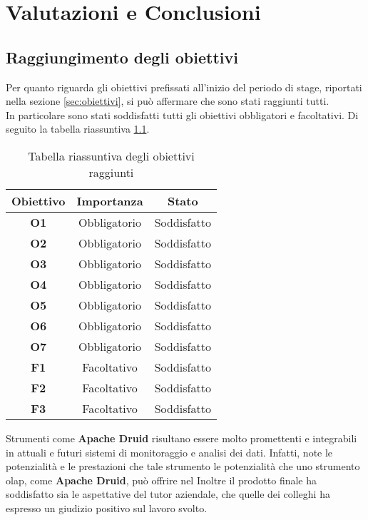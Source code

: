 \chapter{Valutazioni e Conclusioni}
\label{cap:conclusioni}
\section{Raggiungimento degli obiettivi}
Per quanto riguarda gli obiettivi prefissati all'inizio del periodo di stage, riportati nella sezione \ref{sec:obiettivi}, si può affermare che sono stati raggiunti tutti.\\
In particolare sono stati soddisfatti tutti gli obiettivi obbligatori e facoltativi. Di seguito la tabella riassuntiva \ref{tab:obiettivi_raggiunti}.\\


\begin{table}[h]
    \centering
    \caption{Tabella riassuntiva degli obiettivi raggiunti}
    \label{tab:obiettivi_raggiunti}
    \begin{tabular}{|c|c|c|}
        \hline
        \textbf{Obiettivo} & \textbf{Importanza} & \textbf{Stato} \\\hline
        \textbf{O1} & Obbligatorio & Soddisfatto \\\hline
        \textbf{O2} & Obbligatorio & Soddisfatto\\\hline
        \textbf{O3} & Obbligatorio & Soddisfatto\\\hline
        \textbf{O4} & Obbligatorio & Soddisfatto \\ \hline
        \textbf{O5} & Obbligatorio & Soddisfatto \\\hline
        \textbf{O6} & Obbligatorio & Soddisfatto \\\hline
        \textbf{O7} & Obbligatorio & Soddisfatto \\\hline
        \textbf{F1} & Facoltativo & Soddisfatto\\\hline
        \textbf{F2} & Facoltativo & Soddisfatto \\\hline
        \textbf{F3} & Facoltativo & Soddisfatto\\\hline
    \end{tabular} 
\end{table}
\noindent

Strumenti come \textbf{Apache Druid} risultano essere molto promettenti e 
integrabili in attuali e futuri sistemi di monitoraggio e analisi dei dati.
Infatti, note le potenzialità e le prestazioni che tale strumento 
le potenzialità che uno strumento \gls{olap}{}, come \textbf{Apache Druid}, può offrire 
nel
Inoltre il prodotto finale ha soddisfatto sia le aspettative del tutor aziendale, che quelle dei colleghi 
ha espresso un giudizio positivo sul lavoro svolto.\\
